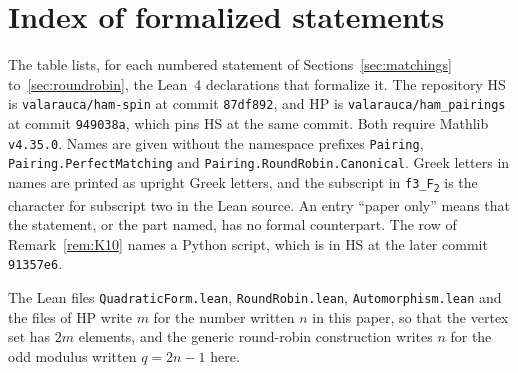 \section{Index of formalized statements}\label{app:lean}

\newcommand{\us}{\_\allowbreak}
\newcommand{\ld}[1]{\texttt{#1}}
\newcommand{\Lrho}{\ensuremath{\uprho}}
\newcommand{\Liota}{\ensuremath{\upiota}}
\newcommand{\Ldelta}{\ensuremath{\updelta}}
\newcommand{\LGamma}{\ensuremath{\Gamma}}
\newcommand{\LTheta}{\ensuremath{\Theta}}
\newcommand{\HS}{\textsf{HS}}
\newcommand{\HP}{\textsf{HP}}

The table lists, for each numbered statement of Sections~\ref{sec:matchings} to~\ref{sec:roundrobin}, the Lean~4 declarations that formalize it. The repository \HS{} is \texttt{valarauca/ham-spin} at commit \texttt{87df892}, and \HP{} is \texttt{valarauca/ham\_pairings} at commit \texttt{949038a}, which pins \HS{} at the same commit. Both require Mathlib \texttt{v4.35.0}. Names are given without the namespace prefixes \texttt{Pairing}, \texttt{Pairing.PerfectMatching} and \texttt{Pairing.RoundRobin.Canonical}. Greek letters in names are printed as upright Greek letters, and the subscript in \ld{f3\us{}F}\textsubscript{\texttt{2}} is the character for subscript two in the Lean source. An entry ``paper only'' means that the statement, or the part named, has no formal counterpart. The row of Remark~\ref{rem:K10} names a Python script, which is in \HS{} at the later commit \texttt{91357e6}.

The Lean files \texttt{QuadraticForm.lean}, \texttt{RoundRobin.lean}, \texttt{Automorphism.lean} and the files of \HP{} write $m$ for the number written $n$ in this paper, so that the vertex set has $2m$ elements, and the generic round-robin construction writes $n$ for the odd modulus written $q=2n-1$ here.

